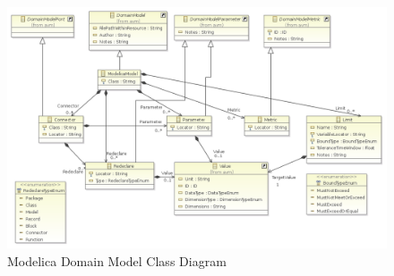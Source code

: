 \begin{figure}[H]
\centering
\includegraphics[width=\textwidth]{./AVM_Formal_Semantics/7}
\caption{Modelica Domain Model Class Diagram}
\end{figure}

